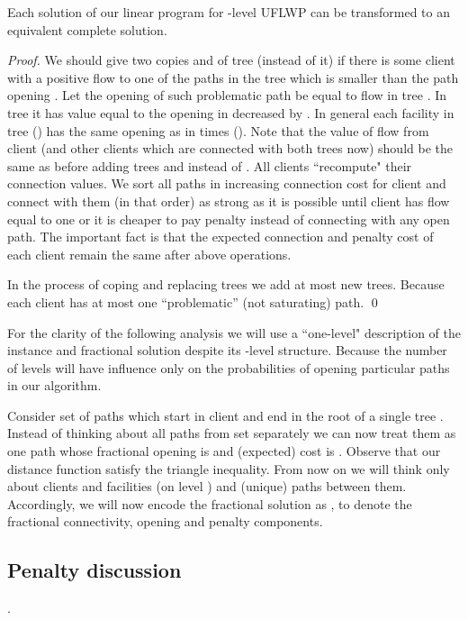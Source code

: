 \documentclass{llncs}
\begin{document}
\begin{lemma} \label{completeness}
 Each solution of our linear program for -level UFLWP can be transformed to an equivalent complete solution.
\end{lemma}
\begin{proof}
We should give two copies  and  of tree  (instead of it) if there is some client  with a positive flow  to one of the paths  in the tree  which is smaller than the path opening . Let the opening of such problematic path be equal to flow  in tree . In tree  it has value equal to the opening in  decreased by . In general each facility in tree  () has the same opening as in  times  (). Note that the value of flow from client  (and other clients which are connected with both trees now) should be the same as before adding trees  and  instead of . All clients ``recompute" their connection values.
We sort all paths in increasing connection cost for client  and connect with them (in that order) as strong as it is possible until client  has flow equal to one or it is cheaper to pay penalty instead of connecting with any open path. The important fact is that the expected connection and penalty cost of each client remain the same after above operations.

In the process of coping and replacing trees we add at most  new trees. Because each client has at most one {``problematic''} (not saturating) path.
\qed
\end{proof}

For the clarity of the following analysis we will use a ``one-level" description of the instance and fractional solution despite its -level structure. Because the number of levels will have influence only on the probabilities of opening particular paths in our algorithm.

Consider set  of paths which start in client  and end in the root of a single tree . Instead of thinking about all paths from set  separately we can now treat them as one path  whose fractional opening is 
and (expected) cost is . Observe that our distance function  satisfy the triangle inequality. From now on we will think only about clients and facilities (on level ) and (unique) paths between them. Accordingly, we will now encode the fractional solution as , to denote the fractional connectivity, opening and penalty components.

\subsection{Penalty discussion}
\begin{lemma}
 \label{ineq_proof}
 {.}
\end{lemma}
\end{document}
